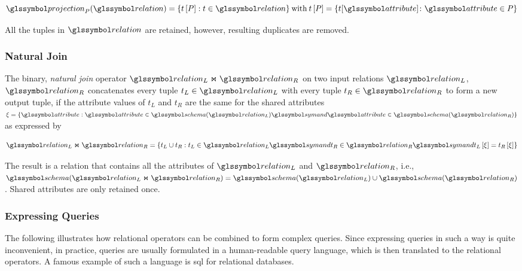 \begin{equation}
    \label{equation:rel_op_projection}
    \projection_{P}(\relation) = \{ t\left[ P \right] : t \in \relation \} \: \textrm{with} \: t\left[ P \right] = \{ t[\attribute] \colon \attribute \in P \}
\end{equation}

All the tuples in $\relation$ are retained, however, resulting duplicates are removed.

\subsubsection{Natural Join}

The binary, \emph{natural join} operator $\relation_L \Join \relation_R$ on two input relations $\relation_L$, $\relation_R$ concatenates every tuple $t_{L} \in \relation_L$ with every tuple $t_{R} \in \relation_R$ to form a new output tuple, if the attribute values of $t_{L}$ and $t_{R}$ are the same for the shared attributes $\xi = \{ \attribute : \attribute \in \schema(\relation_L) \symand \attribute \in \schema(\relation_R) \}$ as expressed by 

\begin{equation}
    \label{equation:rel_op_join}
    \relation_L \Join \relation_R = \{ t_L \cup t_R : t_L \in \relation_L \symand t_R \in \relation_R \symand t_L\left[ \xi \right] = t_R\left[ \xi \right] \}
\end{equation}

The result is a relation that contains all the attributes of $\relation_L$ and $\relation_R$, i.e., $\schema(\relation_L \Join \relation_R) = \schema(\relation_L) \cup \schema(\relation_R)$. Shared attributes are only retained once.


\subsubsection{Expressing Queries}

The following  illustrates how relational operators can be combined to form complex queries. Since expressing queries in such a way is quite inconvenient, in practice, queries are usually formulated in a human-readable query language, which is then translated to the relational operators. A famous example of such a language is \acrshort{sql} \cite{Chamberlin:2012Early} for relational databases.

